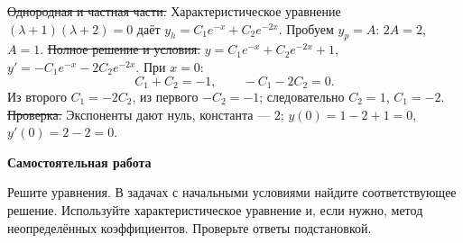 \st{Однородная и частная части.} Характеристическое уравнение
$(\lambda+1)(\lambda+2)=0$ даёт $y_h=C_1e^{-x}+C_2e^{-2x}$.
Пробуем $y_p=A$: $2A=2$, $A=1$.
\st{Полное решение и условия.} $y=C_1e^{-x}+C_2e^{-2x}+1$,
$y'=-C_1e^{-x}-2C_2e^{-2x}$. При $x=0$:
$$C_1+C_2=-1,\qquad -C_1-2C_2=0.$$
Из второго $C_1=-2C_2$, из первого $-C_2=-1$;
следовательно $C_2=1$, $C_1=-2$.
\st{Проверка.} Экспоненты дают нуль, константа --- $2$;
$y(0)=1-2+1=0$, $y'(0)=2-2=0$.

\vfil\eject
\centerline{\bf Самостоятельная работа}
\bigskip
Решите уравнения. В задачах с начальными условиями найдите соответствующее
решение. Используйте характеристическое уравнение и, если нужно, метод
неопределённых коэффициентов. Проверьте ответы подстановкой.
\bye

